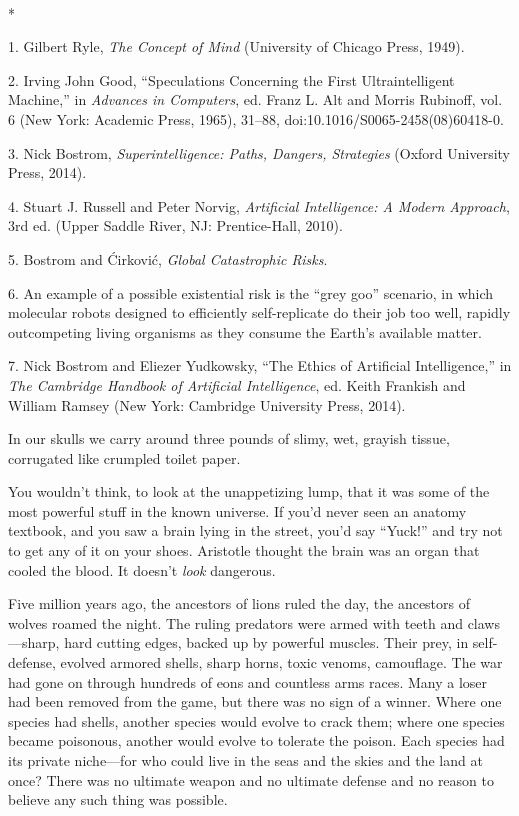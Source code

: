 {
 ~}

{\centering
 *
\par}


\bigskip

{
 1. Gilbert Ryle, \textit{The Concept of Mind} (University of
Chicago Press, 1949).}

{
 2. Irving John Good, ``Speculations Concerning
the First Ultraintelligent Machine,'' in
\textit{Advances in Computers}, ed. Franz L. Alt and Morris Rubinoff,
vol. 6 (New York: Academic Press, 1965), 31--88,
doi:10.1016/S0065-2458(08)60418-0.}

{
 3. Nick Bostrom, \textit{Superintelligence: Paths, Dangers,
Strategies} (Oxford University Press, 2014).}

{
 4. Stuart J. Russell and Peter Norvig, \textit{Artificial
Intelligence: A Modern Approach}, 3rd ed. (Upper Saddle River, NJ:
Prentice-Hall, 2010).}

{
 5. Bostrom and \'Cirkovi\'c, \textit{Global Catastrophic Risks}.}

{
 6. An example of a possible existential risk is the
``grey goo'' scenario, in which
molecular robots designed to efficiently self-replicate do their job
too well, rapidly outcompeting living organisms as they consume the
Earth's available matter.}

{
 7. Nick Bostrom and Eliezer Yudkowsky, ``The
Ethics of Artificial Intelligence,'' in \textit{The
Cambridge Handbook of Artificial Intelligence}, ed. Keith Frankish and
William Ramsey (New York: Cambridge University Press, 2014).}


{
 In our skulls we carry around three pounds of slimy, wet, grayish
tissue, corrugated like crumpled toilet paper.}

{
 You wouldn't think, to look at the unappetizing
lump, that it was some of the most powerful stuff in the known
universe. If you'd never seen an anatomy textbook, and
you saw a brain lying in the street, you'd say
``Yuck!'' and try not to get any of
it on your shoes. Aristotle thought the brain was an organ that cooled
the blood. It doesn't \textit{look} dangerous.}

{
 Five million years ago, the ancestors of lions ruled the day, the
ancestors of wolves roamed the night. The ruling predators were armed
with teeth and claws---sharp, hard cutting edges, backed up by powerful
muscles. Their prey, in self-defense, evolved armored shells, sharp
horns, toxic venoms, camouflage. The war had gone on through hundreds
of eons and countless arms races. Many a loser had been removed from
the game, but there was no sign of a winner. Where one species had
shells, another species would evolve to crack them; where one species
became poisonous, another would evolve to tolerate the poison. Each
species had its private niche---for who could live in the seas and the
skies and the land at once? There was no ultimate weapon and no
ultimate defense and no reason to believe any such thing was possible.}

